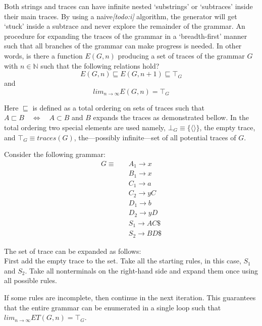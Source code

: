 \documentclass[a4paper,11pt]{article}
\begin{document}
Both strings and traces can have infinite nested `substrings' or `subtraces' inside their main traces.
By using a naive\emph{[todo:i]} algorithm, the generator will get `stuck' inside a subtrace and never explore the remainder of the grammar.
An procedure for expanding the traces of the grammar in a `breadth-first' manner such that all branches of the grammar can make progress is needed.
In other words, is there a function $E(G, n)$ producing a set of traces of the grammar $G$ with $n \in \mathbb{N}$ such that the following relations hold?
\begin{equation} E(G, n) \sqsubseteq E(G, n+1) \sqsubseteq \top_{G} \end{equation} and \begin{equation} lim_{n \to \infty} E(G,n) = \top_{G} \end{equation}

Here $\sqsubseteq$ is defined as a total ordering on sets of traces such that $A \sqsubset B \quad \Longleftrightarrow \quad A \subset B$ and $B$ expands the traces as demonstrated bellow.
In the total ordering two special elements are used namely, $\bot_{G} \equiv \{ \langle \rangle \}$, the empty trace, and $\top_{G} \equiv traces(G)$, the---possibly infinite---set of all potential traces of $G$.

Consider the following grammar:
\begin{align*}
G \equiv \quad & A_1 \rightarrow x\\
               & B_1 \rightarrow x\\
               & C_1 \rightarrow a\\
               & C_2 \rightarrow y C\\
               & D_1 \rightarrow b\\
               & D_2 \rightarrow y D\\
               & S_1 \rightarrow A C \$\\
               & S_2 \rightarrow B D \$
\end{align*}

The set of trace can be expanded as follows:\\
First add the empty trace to the set. Take all the starting rules, in this case, $S_1$ and $S_2$.
Take all nonterminals on the right-hand side and expand them once using all possible rules. 

If some rules are incomplete, then continue in the next iteration. This guarantees that the entire grammar can be enumerated in a single loop such that $lim_{n \to \infty} ET(G,n) = \top_{G}$.
\end{document}
